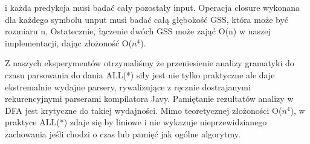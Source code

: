 i każda predykcja musi badać cały pozostały input.
Operacja closure wykonana dla każdego symbolu unput musi badać
całą głębokość GSS, która może być rozmiaru n, Ostatecznie, łączenie
dwóch GSS może zająć O(n) w naszej implementacji, dając
złożoność O($n^4$).
\par
Z naszych eksperymentów otrzymaliśmy że przeniesienie analizy gramatyki
do czasu parsowania do dania ALL(*) siły jest nie tylko praktyczne
ale daje ekstremalnie wydajne parsery, rywalizujące z
ręcznie dostrajanymi rekurencyjnymi parserami kompilatora Javy.
Pamiętanie rezultatów analizy w DFA jest krytyczne do takiej wydajności.
Mimo teoretycznej złożoności O($n^4$), w praktyce ALL(*) zdaje się by liniowe
i nie wykazuje nieprzewidzianego zachowania jeśli chodzi o czas lub
pamięć jak ogólne algorytmy.

